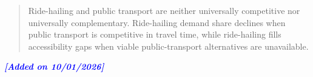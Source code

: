 \documentclass[10pt,a4paper]{article}
\begin{document}
\begin{quote}
Ride-hailing and public transport are neither universally competitive nor universally complementary. Ride-hailing demand share declines when public transport is competitive in travel time, while ride-hailing fills accessibility gaps when viable public-transport alternatives are unavailable.
\end{quote}


\textit{\textbf{\textcolor{blue}{[Added on 10/01/2026]}}}
\end{document}
